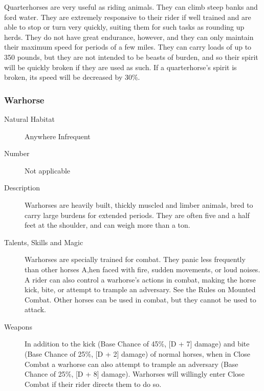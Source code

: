 \begin{multicols}{2}
\begin{description}
\setlength\itemsep{0pt}

\item[Comments]Quarterhorses are very useful as riding animals.  They can climb steep
banks and ford water. They are extremely responsive to their rider if
well trained and are able to stop or turn very quickly, suiting them
for such tasks as rounding up herds. They do not have great endurance,
however, and they can only maintain their maximum speed for periods of
a few miles. They can carry loads of up to 350 pounds, but they are
not intended to be beasts of burden, and so their spirit will be
quickly broken if they are used as such. If a quarterhorse's spirit is
broken, its speed will be decreased by 30\%.

\end{description}

\subsubsection{Warhorse}

\begin{description}
\item[Natural Habitat] Anywhere Infrequent

\item[Number] Not applicable

\item[Description] Warhorses are heavily built, thickly muscled and limber
animals, bred to carry large burdens for extended periods. They are
often five and a half feet at the shoulder, and can weigh more than a
ton.

\item[Talents, Skills and Magic] Warhorses are specially trained for combat. They panic less
frequently than other horses A,hen faced with fire, sudden movements,
or loud noises. A rider can also control a warhorse's actions in
combat, making the horse kick, bite, or attempt to trample an
adversary.  See the Rules on Mounted Combat. Other horses can be used
in combat, but they cannot be used to attack.

\item[Weapons] In addition to the kick (Base Chance of 45\%, [D + 7]
damage) and bite (Base Chance of 25\%, [D + 2] damage) of normal
horses, when in Close Combat a warhorse can also attempt to trample an
adversary (Base Chance of 25\%, [D + 8] damage).  Warhorses will
willingly enter Close Combat if their rider directs them to do so.


\end{description}
\end{multicols}
